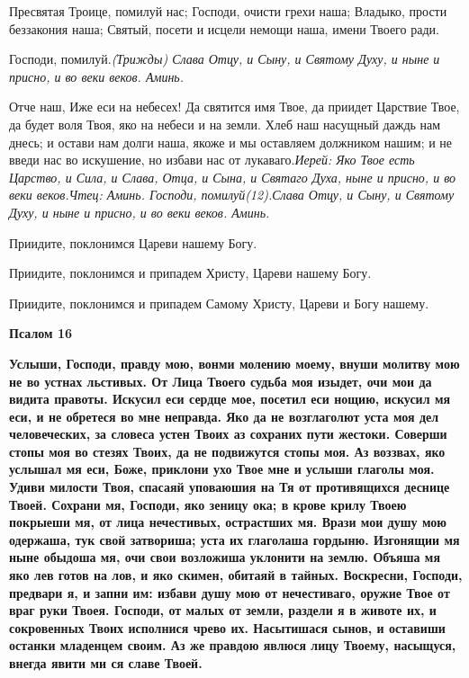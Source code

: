 Пресвятая Троице, помилуй нас; Господи, очисти грехи наша; Владыко, прости беззакония наша; Святый, посети и исцели немощи наша, имени Твоего ради.



Господи, помилуй.\itshape  (Трижды)\normalfont{} Слава Отцу, и Сыну, и Святому Духу, и ныне и присно, и во веки веков. Аминь.

Отче наш, Иже еси на небесех! Да святится имя Твое, да приидет Царствие Твое, да будет воля Твоя, яко на небеси и на земли. Хлеб наш насущный даждь нам днесь; и остави нам долги наша, якоже и мы оставляем должником нашим; и не введи нас во искушение, но избави нас от лукаваго.\itshape Иерей\normalfont{}: Яко Твое есть Царство, и Сила, и Слава, Отца, и Сына, и Святаго Духа, ныне и присно, и во веки веков.\itshape Чтец\normalfont{}: Аминь. Господи, помилуй\itshape  (12).\normalfont{}Слава Отцу, и Сыну, и Святому Духу, и ныне и присно, и во веки веков. Аминь.

Приидите, поклонимся Цареви нашему Богу.

Приидите, поклонимся и припадем Христу, Цареви нашему Богу.

Приидите, поклонимся и припадем Самому Христу, Цареви и Богу нашему.


\medskip
\bfseries Псалом 16\normalfont{}\nopagebreak

\bfseries \normalfont{}Услыши, Господи, правду мою, вонми молению моему, внуши молитву мою не во устнах льстивых. От Лица Твоего судьба моя изыдет, очи мои да видита правоты. Искусил еси сердце мое, посетил еси нощию, искусил мя еси, и не обретеся во мне неправда. Яко да не возглаголют уста моя дел человеческих, за словеса устен Твоих аз сохраних пути жестоки. Соверши стопы моя во стезях Твоих, да не подвижутся стопы моя. Аз воззвах, яко услышал мя еси, Боже, приклони ухо Твое мне и услыши глаголы моя. Удиви милости Твоя, спасаяй уповаюшия на Тя от противящихся деснице Твоей. Сохрани мя, Господи, яко зеницу ока; в крове крилу Твоею покрыеши мя, от лица нечестивых, острастших мя. Врази мои душу мою одержаша, тук свой затвориша; уста их глаголаша гордыню. Изгонящии мя ныне обыдоша мя, очи свои возложиша уклонити на землю. Объяша мя яко лев готов на лов, и яко скимен, обитаяй в тайных. Воскресни, Господи, предвари я, и запни им: избави душу мою от нечестиваго, оружие Твое от враг руки Твоея. Господи, от малых от земли, раздели я в животе их, и сокровенных Твоих исполнися чрево их. Насытишася сынов, и оставиши останки младенцем своим. Аз же правдою явлюся лицу Твоему, насыщуся, внегда явити ми ся славе Твоей.


